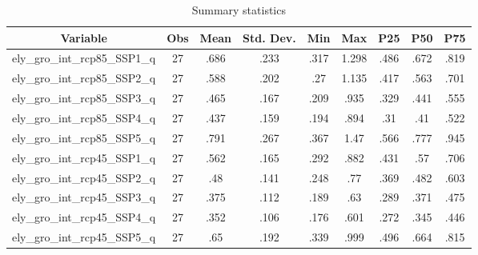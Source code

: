 \begin{table}[htbp]\centering \caption{Summary statistics\label{sumstat}}
\begin{tabular}{l c c c c c c c c}\hline\hline
\multicolumn{1}{c}{Variable} & Obs & Mean & Std. Dev.
 & Min & Max & P25 & P50 & P75  \\ \hline
ely\_gro\_int\_rcp85\_SSP1\_q & 27 & .686 & .233 & .317 & 1.298 & .486 & .672 & .819 \\
ely\_gro\_int\_rcp85\_SSP2\_q & 27 & .588 & .202 & .27 & 1.135 & .417 & .563 & .701 \\
ely\_gro\_int\_rcp85\_SSP3\_q & 27 & .465 & .167 & .209 & .935 & .329 & .441 & .555 \\
ely\_gro\_int\_rcp85\_SSP4\_q & 27 & .437 & .159 & .194 & .894 & .31 & .41 & .522 \\
ely\_gro\_int\_rcp85\_SSP5\_q & 27 & .791 & .267 & .367 & 1.47 & .566 & .777 & .945 \\
ely\_gro\_int\_rcp45\_SSP1\_q & 27 & .562 & .165 & .292 & .882 & .431 & .57 & .706 \\
ely\_gro\_int\_rcp45\_SSP2\_q & 27 & .48 & .141 & .248 & .77 & .369 & .482 & .603 \\
ely\_gro\_int\_rcp45\_SSP3\_q & 27 & .375 & .112 & .189 & .63 & .289 & .371 & .475 \\
ely\_gro\_int\_rcp45\_SSP4\_q & 27 & .352 & .106 & .176 & .601 & .272 & .345 & .446 \\
ely\_gro\_int\_rcp45\_SSP5\_q & 27 & .65 & .192 & .339 & .999 & .496 & .664 & .815 \\
\hline\end{tabular}
\end{table}
